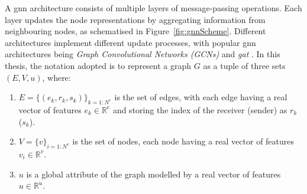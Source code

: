 A \gls{gnn} architecture consists of multiple layers of message-passing operations. Each layer updates the node representations by aggregating information from neighbouring nodes, as schematised in Figure~\ref{fig:gnnScheme}. Different architectures implement different update processes, with popular \gls{gnn} architectures being \textit{Graph Convolutional Networks (GCNs)} \cite{gcnPaper} and \textit{\gls{gat}} \cite{velickovic2018graph}. In this thesis, the notation adopted is to represent a graph $G$ as a tuple of three sets $(E, V, u)$, where:
\begin{enumerate}
    \item $E = \{(e_k, r_k, s_k)\}_{k=1:N^e}$ is the set of edges, with each edge having a real vector of features $e_k \in \mathbb{R}^e$ and storing the index of the receiver (sender) as $r_k$ ($s_k$).
    \item $V = \{v\}_{i=1:N^v}$ is the set of nodes, each node having a real vector of features $v_i \in \mathbb{R}^v$.
    \item $u$ is a global attribute of the graph modelled by a real vector of features $u \in \mathbb{R}^u$. 
\end{enumerate}

